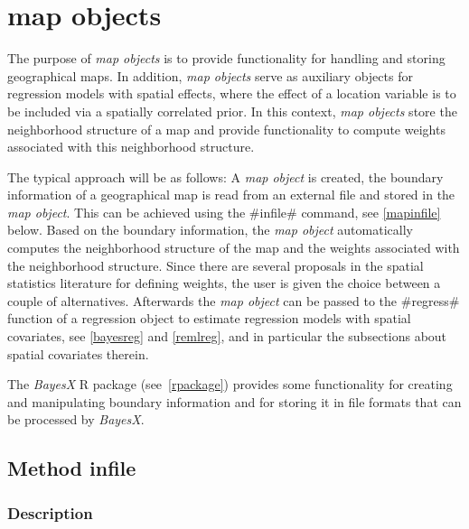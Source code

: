\chapter{map objects}
\label{map} 

The purpose of {\em map objects} is to provide functionality for handling and storing geographical maps. In addition, {\em map
objects} serve as auxiliary objects for regression models with spatial effects, where the effect of a location variable is to
be included via a spatially correlated prior. In this context, {\em map objects} store the neighborhood structure of a map and
provide functionality to compute weights associated with this neighborhood structure.

The typical approach will be as follows: A {\em map object} is created, the boundary information of a geographical map is read
from an external file and stored in the {\em map object}. This can be achieved using the #infile# command, see
\autoref{mapinfile} below. Based on the boundary information, the {\em map object} automatically computes the neighborhood
structure of the map and the weights associated with the neighborhood structure. Since there are several proposals in the
spatial statistics literature for defining weights, the user is given the choice between a couple of alternatives. Afterwards
the {\em map object} can be passed to the #regress# function of a regression object to estimate regression models with spatial
covariates, see \autoref{bayesreg} and \autoref{remlreg}, and in particular the subsections about spatial covariates therein.

The {\it BayesX} R package (see~\autoref{rpackage}) provides some functionality for creating and manipulating boundary
information and for storing it in file formats that can be processed by {\it BayesX}.

\clearpage



\section{Method infile}
\label{mapinfile}    
 

\subsection{Description}


